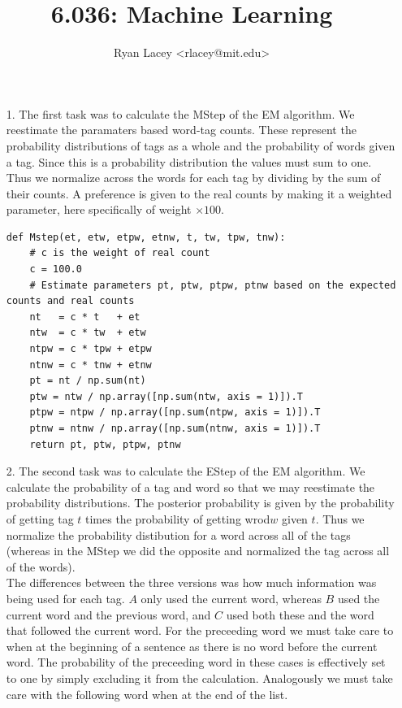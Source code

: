 \documentclass{article}
\begin{document}

\title{6.036: Machine Learning}
\author{
  Ryan Lacey <rlacey@mit.edu>\\
}
        
\maketitle
        

\begin{enumerate}
\item[1.]
	The first task was to calculate the MStep of the EM algorithm. We reestimate the paramaters based word-tag counts. These represent the probability distributions of tags as a whole and the probability of words given a tag. Since this is a probability distribution the values must sum to one. Thus we normalize across the words for each tag by dividing by the sum of their counts. A preference is given to the real counts by making it a weighted parameter, here specifically of weight $\times 100$.\\

\begin{lstlisting}   
def Mstep(et, etw, etpw, etnw, t, tw, tpw, tnw):
	# c is the weight of real count
	c = 100.0
	# Estimate parameters pt, ptw, ptpw, ptnw based on the expected counts and real counts
	nt   = c * t   + et
	ntw  = c * tw  + etw
	ntpw = c * tpw + etpw
	ntnw = c * tnw + etnw
	pt = nt / np.sum(nt)
	ptw = ntw / np.array([np.sum(ntw, axis = 1)]).T
	ptpw = ntpw / np.array([np.sum(ntpw, axis = 1)]).T
	ptnw = ntnw / np.array([np.sum(ntnw, axis = 1)]).T
	return pt, ptw, ptpw, ptnw
\end{lstlisting}

\newpage

\item[2.]
	The second task was to calculate the EStep of the EM algorithm. We calculate the probability of a tag and word so that we may reestimate the probability distributions. The posterior probability is given by the probability of getting tag $t$ times the probability of getting wrod$w$ given $t$. Thus we normalize the probability distibution for a word across all of the tags (whereas in the MStep we did the opposite and normalized the tag across all of the words). \\
	
	The differences between the three versions was how much information was being used for each tag. $A$ only used the current word, whereas $B$ used the current word and the previous word, and $C$ used both these and the word that followed the current word. For the preceeding word we must take care to when at the beginning of a sentence as there is no word before the current word. The probability of the preceeding word in these cases is effectively set to one by simply excluding it from the calculation. Analogously we must take care with the following word when at the end of the list. \\ 


\end{enumerate}
\end{document}
